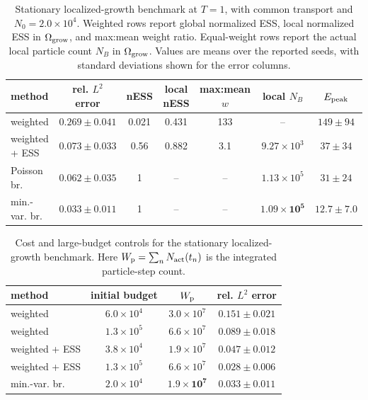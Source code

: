 \begin{table}[t]
\centering
\small
\caption{Stationary localized-growth benchmark at \(T=1\), with common transport and
\(N_0=2.0\times10^4\).  Weighted rows report global normalized ESS, local normalized
ESS in \(\Omega_{\rm grow}\), and max:mean weight ratio.  Equal-weight rows report the
actual local particle count \(N_B\) in \(\Omega_{\rm grow}\).  Values are means over the
reported seeds, with standard deviations shown for the error columns.}
\label{tab:bw}
\begin{tabular}{l c c c c c c}
\toprule
method & rel. \(L^2\) error & nESS & local nESS & max:mean \(w\) & local \(N_B\) & \(E_{\rm peak}\) \\
\midrule
weighted & \(0.269\pm0.041\) & 0.021 & 0.431 & 133 & -- & \(149\pm94\) \\
weighted + ESS & \(0.073\pm0.033\) & 0.56 & 0.882 & 3.1 & \(9.27\times10^3\) & \(37\pm34\) \\
Poisson br. & \(0.062\pm0.035\) & 1 & -- & -- & \(1.13\times10^5\) & \(31\pm24\) \\
min.-var. br. & \(\mathbf{0.033\pm0.011}\) & 1 & -- & -- & \(\mathbf{1.09\times10^5}\) & \(\mathbf{12.7\pm7.0}\) \\
\bottomrule
\end{tabular}
\end{table}

\begin{table}[t]
\centering
\caption{Cost and large-budget controls for the stationary localized-growth benchmark.
Here \(W_{\rm p}=\sum_n N_{\rm act}(t_n)\) is the integrated particle-step count.}
\label{tab:bw_cost}
\begin{tabular}{l c c c}
\toprule
method & initial budget & \(W_{\rm p}\) & rel. \(L^2\) error \\
\midrule
weighted & \(6.0\times10^4\) & \(3.0\times10^7\) & \(0.151\pm0.021\) \\
weighted & \(1.3\times10^5\) & \(6.6\times10^7\) & \(0.089\pm0.018\) \\
weighted + ESS & \(3.8\times10^4\) & \(1.9\times10^7\) & \(0.047\pm0.012\) \\
weighted + ESS & \(1.3\times10^5\) & \(6.6\times10^7\) & \(0.028\pm0.006\) \\
min.-var. br. & \(2.0\times10^4\) & \(\mathbf{1.9\times10^7}\) & \(\mathbf{0.033\pm0.011}\) \\
\bottomrule
\end{tabular}
\end{table}

